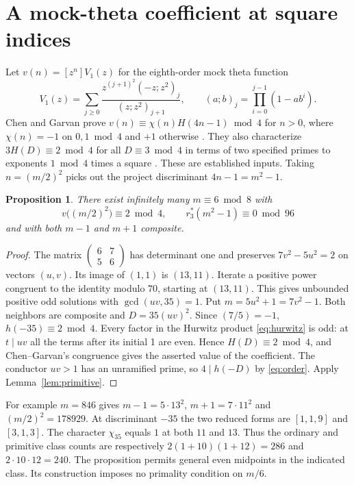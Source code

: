 \documentclass[11pt]{article}
\newtheorem{proposition}[theorem]{Proposition}
\begin{document}
\section{A mock-theta coefficient at square indices}
Let $v(n)=[z^n]V_1(z)$ for the eighth-order mock theta function
\[
 V_1(z)=\sum_{j\ge0}\frac{z^{(j+1)^2}(-z;z^2)_j}{(z;z^2)_{j+1}},
 \qquad (a;b)_j=\prod_{i=0}^{j-1}(1-ab^i).
\]
Chen and Garvan prove $v(n)\equiv\chi(n)H(4n-1)\bmod4$ for $n>0$,
where $\chi(n)=-1$ on $0,1\bmod4$ and $+1$ otherwise
\cite[Lemma 3.4]{chen}. They also characterize $3H(D)\equiv2\bmod4$
for all $D\equiv3\bmod4$ in terms of two specified primes to exponents
$1\bmod4$ times a square \cite[Theorem 2.5]{chen}. These are
established inputs. Taking $n=(m/2)^2$ picks out the project
discriminant $4n-1=m^2-1$.

\begin{proposition}\label{prop:mock}
There exist infinitely many $m\equiv6\bmod8$ with
\[
   v\bigl((m/2)^2\bigr)\equiv2\bmod4,\qquad
   r_3^*(m^2-1)\equiv0\bmod96
\]
and with both $m-1$ and $m+1$ composite.
\end{proposition}
\begin{proof}
The matrix $\left(\begin{smallmatrix}6&7\\5&6\end{smallmatrix}\right)$
has determinant one and preserves $7v^2-5u^2=2$ on vectors $(u,v)$.
Its image of $(1,1)$ is $(13,11)$. Iterate a positive power congruent
to the identity modulo $70$, starting at $(13,11)$. This gives
unbounded positive odd solutions with $\gcd(uv,35)=1$. Put
$m=5u^2+1=7v^2-1$. Both neighbors are composite and
$D=35(uv)^2$. Since $(7/5)=-1$, $h(-35)\equiv2\bmod4$.
Every factor in the Hurwitz product \eqref{eq:hurwitz} is odd:
at $t\mid uv$ all the terms after its initial 1 are even. Hence
$H(D)\equiv2\bmod4$, and Chen--Garvan's congruence gives the asserted
value of the coefficient. The conductor $uv>1$ has an unramified
prime, so $4\mid h(-D)$ by \eqref{eq:order}. Apply
Lemma~\ref{lem:primitive}.
\end{proof}
For example $m=846$ gives $m-1=5\cdot13^2$, $m+1=7\cdot11^2$
and $(m/2)^2=178929$. At discriminant $-35$ the two reduced forms
are $[1,1,9]$ and $[3,1,3]$. The character $\chi_{35}$ equals $1$
at both $11$ and $13$. Thus the ordinary and primitive class
counts are respectively $2(1+10)(1+12)=286$ and $2\cdot10\cdot12=240$.
The proposition permits general even midpoints
in the indicated class. Its construction imposes no primality
condition on $m/6$.
\end{document}
